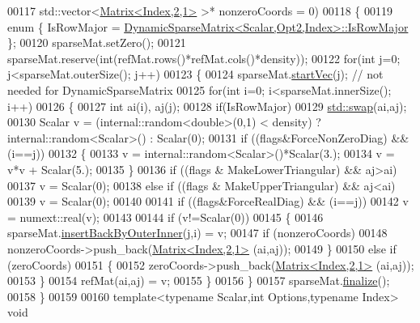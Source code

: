 \begin{DoxyCode}
00117            std::vector<\hyperlink{group___core___module_class_eigen_1_1_matrix}{Matrix<Index,2,1>} >* nonzeroCoords = 0)
00118 \{
00119   \textcolor{keyword}{enum} \{ IsRowMajor = \hyperlink{class_eigen_1_1_dynamic_sparse_matrix}{DynamicSparseMatrix<Scalar,Opt2,Index>::IsRowMajor}
       \};
00120   sparseMat.setZero();
00121   sparseMat.reserve(\textcolor{keywordtype}{int}(refMat.rows()*refMat.cols()*density));
00122   \textcolor{keywordflow}{for}(\textcolor{keywordtype}{int} j=0; j<sparseMat.outerSize(); j++)
00123   \{
00124     sparseMat.\hyperlink{class_eigen_1_1_dynamic_sparse_matrix_a294b998a50cc01859425e5e7c23d6108}{startVec}(j); \textcolor{comment}{// not needed for DynamicSparseMatrix}
00125     \textcolor{keywordflow}{for}(\textcolor{keywordtype}{int} i=0; i<sparseMat.innerSize(); i++)
00126     \{
00127       \textcolor{keywordtype}{int} ai(i), aj(j);
00128       \textcolor{keywordflow}{if}(IsRowMajor)
00129         \hyperlink{endian_8c_a3ca5ecd34b04d6a243c054ac3a57f68d}{std::swap}(ai,aj);
00130       Scalar v = (internal::random<double>(0,1) < density) ? internal::random<Scalar>() : Scalar(0);
00131       \textcolor{keywordflow}{if} ((flags&ForceNonZeroDiag) && (i==j))
00132       \{
00133         v = internal::random<Scalar>()*Scalar(3.);
00134         v = v*v + Scalar(5.);
00135       \}
00136       \textcolor{keywordflow}{if} ((flags & MakeLowerTriangular) && aj>ai)
00137         v = Scalar(0);
00138       \textcolor{keywordflow}{else} \textcolor{keywordflow}{if} ((flags & MakeUpperTriangular) && aj<ai)
00139         v = Scalar(0);
00140 
00141       \textcolor{keywordflow}{if} ((flags&ForceRealDiag) && (i==j))
00142         v = numext::real(v);
00143 
00144       \textcolor{keywordflow}{if} (v!=Scalar(0))
00145       \{
00146         sparseMat.\hyperlink{class_eigen_1_1_dynamic_sparse_matrix_ac97c2463058ae55d7f0ef21c851eb5f3}{insertBackByOuterInner}(j,i) = v;
00147         \textcolor{keywordflow}{if} (nonzeroCoords)
00148           nonzeroCoords->push\_back(\hyperlink{group___core___module_class_eigen_1_1_matrix}{Matrix<Index,2,1>} (ai,aj));
00149       \}
00150       \textcolor{keywordflow}{else} \textcolor{keywordflow}{if} (zeroCoords)
00151       \{
00152         zeroCoords->push\_back(\hyperlink{group___core___module_class_eigen_1_1_matrix}{Matrix<Index,2,1>} (ai,aj));
00153       \}
00154       refMat(ai,aj) = v;
00155     \}
00156   \}
00157   sparseMat.\hyperlink{class_eigen_1_1_dynamic_sparse_matrix_aa0abc0e4565143f103f0d7373bd4a125}{finalize}();
00158 \}
00159 
00160 \textcolor{keyword}{template}<\textcolor{keyword}{typename} Scalar,\textcolor{keywordtype}{int} Options,\textcolor{keyword}{typename} Index> \textcolor{keywordtype}{void}

\end{DoxyCode}
